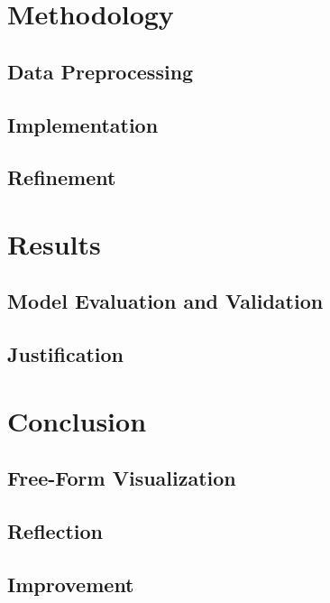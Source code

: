 \documentclass[11pt]{article}
\begin{document}
\section{Methodology}

\subsection{Data Preprocessing}

\subsection{Implementation}

\subsection{Refinement}

\section{Results}

\subsection{Model Evaluation and Validation}

\subsection{Justification}

\section{Conclusion}

\subsection{Free-Form Visualization}

\subsection{Reflection}

\subsection{Improvement}
\end{document}
